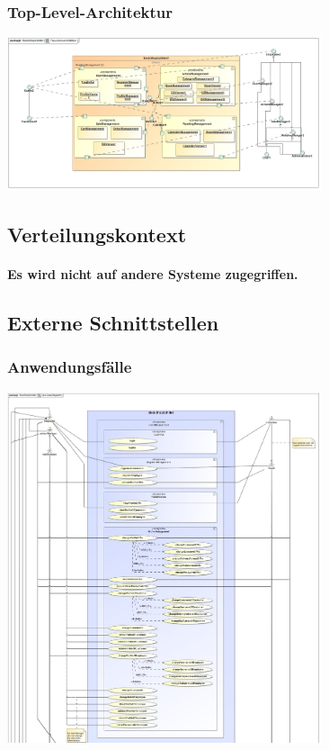 \documentclass[a4paper]{article}
\begin{document}
\subsubsection{Top-Level-Architektur}

\includegraphics[width=350px]{top-level-architektur.jpg}

\subsection{Verteilungskontext}

\paragraph{Es wird nicht auf andere Systeme zugegriffen.}

\subsection{Externe Schnittstellen}

\subsubsection{Anwendungsfälle}

\includegraphics[width=350px]{use-case-diagramm-part1.jpg}
\end{document}
